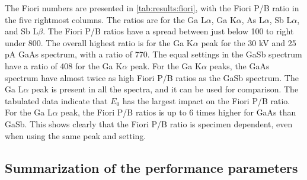 The Fiori numbers are presented in \cref{tab:results:fiori}, with the Fiori P/B ratio in the five rightmost columns.
The ratios are for the Ga L$\alpha$, Ga K$\alpha$, As L$\alpha$, Sb L$\alpha$, and Sb L$\beta$.
The Fiori P/B ratios have a spread between just below 100 to right under 800.
The overall highest ratio is for the Ga K$\alpha$ peak for the 30 kV and 25 pA GaAs spectrum, with a ratio of 770.
The equal settings in the GaSb spectrum have a ratio of 408 for the Ga K$\alpha$ peak.
For the Ga K$\alpha$ peaks, the GaAs spectrum have almost twice as high Fiori P/B ratios as the GaSb spectrum.
The Ga L$\alpha$ peak is present in all the spectra, and it can be used for comparison.
The tabulated data indicate that $E_0$ has the largest impact on the Fiori P/B ratio.
For the Ga L$\alpha$ peak, the Fiori P/B ratios is up to 6 times higher for GaAs than GaSb.
This shows clearly that the Fiori P/B ratio is specimen dependent, even when using the same peak and setting.













\clearpage


\subsection{Summarization of the performance parameters}
\label{results:summarization_of_the_performance_parameters}

